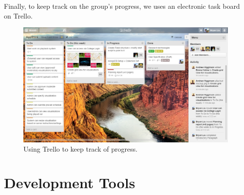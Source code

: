 \documentclass[a4paper]{article}
\begin{document}

Finally, to keep track on the group's progress, we uses an electronic task
board on Trello. %



\begin{figure}[ht]
  \centering
    \includegraphics[width = 0.99\textwidth]{./planning/trello.jpg}
   
  \caption{Using Trello to keep track of progress.}
  \label{fig:trello}
\end{figure}

\section{Development Tools}
\end{document}
